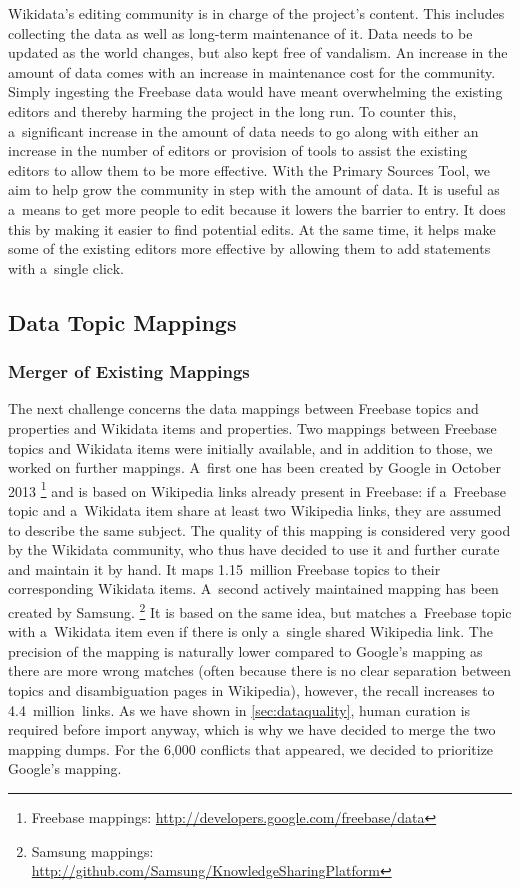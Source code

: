 \documentclass{acm_proc_article-sp}
\begin{document}
Wikidata's editing community is in charge of the project's content. This includes collecting the
data as well as long-term maintenance of it. Data needs to be updated as the world changes, but also
kept free of vandalism. An increase in the amount of data comes with an increase in maintenance
cost for the community. Simply ingesting the Freebase data would have meant overwhelming the
existing editors and thereby harming the project in the long run. To counter this, a~significant
increase in the amount of data needs to go along with either an increase in the number of editors
or provision of tools to assist the existing editors to allow them to be more effective. With the
Primary Sources Tool, we aim to help grow the community in step with the amount of data. It is
useful as a~means to get more people to edit because it lowers the barrier to entry. It does this
by making it easier to find potential edits. At the same time, it helps make some of the existing
editors more effective by allowing them to add statements with a~single click.

\subsection{Data Topic Mappings}\label{subsec:topic-mappings}

\subsubsection{Merger of Existing Mappings}

The next challenge concerns the data mappings between Freebase topics and properties
and Wikidata items and properties.
Two mappings between Freebase topics and Wikidata items were initially available,
and in addition to those, we worked on further mappings.
A~first one has been created by Google in October 2013%
\footnote{Freebase mappings: \url{http://developers.google.com/freebase/data}}
and is based on Wikipedia links already present in Freebase: if a~Freebase topic and
a~Wikidata item share at least two Wikipedia links, they are assumed to describe the same subject.
The quality of this mapping is considered very good by the Wikidata community,
who thus have decided to use it and further curate and maintain it by hand.
It maps 1.15~million Freebase topics to their corresponding Wikidata items.
A~second actively maintained mapping has been created by Samsung.%
\footnote{Samsung mappings: \url{http://github.com/Samsung/KnowledgeSharingPlatform}}
It is based on the same idea, but matches a~Freebase topic with a~Wikidata item
even if there is only a~single shared Wikipedia link.
The precision of the mapping is naturally lower compared to Google's mapping
as there are more wrong matches (often because there is no clear separation between topics
and disambiguation pages in Wikipedia), however, the recall increases to 4.4~million~links.
As we have shown in \autoref{sec:dataquality},
human curation is required before import anyway,
which is why we have decided to merge the two mapping dumps.
For the 6,000 conflicts that appeared, we decided to prioritize Google's mapping.
\end{document}
